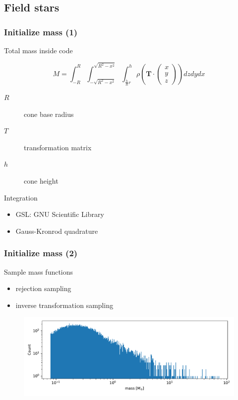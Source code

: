 \documentclass{beamer}
\begin{document}

\subsection{Field stars}

\begin{frame}
\frametitle{Initialize mass (1)}
 Total mass inside code

\begin{equation*}
M = \int_{-R}^{R}\int_{-\sqrt{R^2-x^2}}^{\sqrt{R^2-x^2}}\int_{\frac{h}{R}r}^{h} \rho \left ( \mathbf{T} \cdot \begin{pmatrix}x\\ y\\ z\end{pmatrix} \right ) dzdydx
\end{equation*}

\begin{description}
\item[\(R\)] cone base radius
\item[\(T\)] transformation matrix
\item[\(h\)] cone height
\end{description}

Integration

\begin{itemize}
\item GSL: GNU Scientific Library
\item Gauss-Kronrod quadrature
\end{itemize}

\end{frame}


\begin{frame}
\frametitle{Initialize mass (2)}

Sample mass functions

\begin{itemize}
\item rejection sampling
\item inverse transformation sampling
\end{itemize}

\begin{figure}
\centering
\includegraphics[width=\linewidth]{Images/initial_conditions_mass_bulge.pdf}
\end{figure}

\end{frame}
\end{document}

